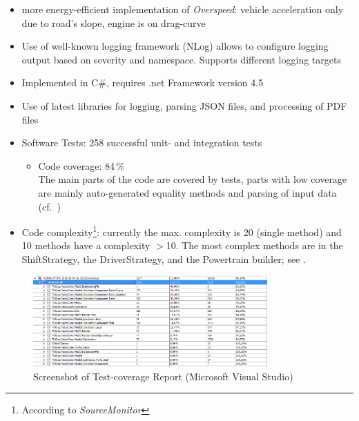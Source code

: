 \begin{itemize}
	\item more energy-efficient implementation of \textit{Overspeed}: vehicle acceleration only due to road's slope, engine is on drag-curve
	\item Use of well-known logging framework (NLog) allows to configure logging output based on severity and namespace. Supports different logging targets
	\item Implemented in C\#, requires .net Framework version 4.5
	\item Use of latest libraries for logging, parsing JSON files, and processing of PDF files
	\item Software Tests: 258 successful unit- and integration tests
	\begin{itemize}
		\item Code coverage: 84\,\% \\
		The main parts of the code are covered by tests, parts with low coverage are mainly auto-generated equality methods and parsing of input data (cf.~)
	\end{itemize}
	\item Code complexity\footnote{According to \textit{SourceMonitor}}: currently the max. complexity is 20 (single method) and 10 methods have a complexity $>$10. The most complex methods are in the ShiftStrategy, the DriverStrategy, and the Powertrain builder; see .%
\end{itemize}

\begin{figure}
	\centering
	\includegraphics[width=0.8\textwidth]{img/Vecto3_0_1_TestCoverage.png}
	\caption{Screenshot of Test-coverage Report (Microsoft Visual Studio)}
	\label{fig:Vecto301_TestCoverage}
\end{figure}

